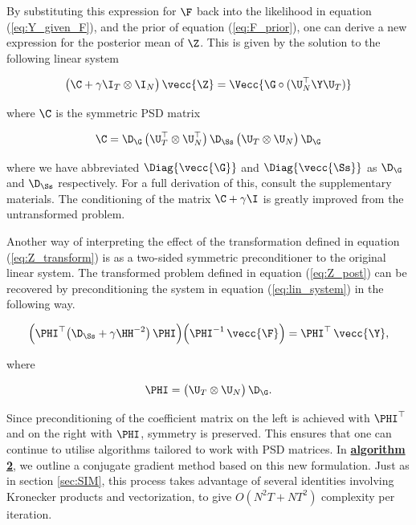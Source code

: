 By substituting this expression for $\F$ back into the likelihood in equation (\ref{eq:Y_given_F}), and the prior of equation (\ref{eq:F_prior}), one can derive a new expression for the posterior mean of $\Z$. This is given by the solution to the following linear system 
    
    \begin{equation}
    \label{eq:Z_post}
       \big( \C + \gamma \I_T \otimes \I_N \big) \, \vecc{\Z} = \Vecc{\G \circ (\U_N^\top \Y \U_T)} 
    \end{equation}
    
    \noindent where $\C$ is the symmetric PSD matrix 
    
    
    \begin{equation}
    \label{eq:Q}
    \C = \D_{\G} \, \big(\U_T^\top \otimes \U_N^\top \big)\, \D_{\Ss} \, \big(\U_T \otimes \U_N \big) \,\D_{\G}
    \end{equation}
    
    \noindent where we have abbreviated $\Diag{\vecc{\G}}$ and $\Diag{\vecc{\Ss}}$ as $\D_{\G}$ and $\D_{\Ss}$ respectively. For a full derivation of this, consult the supplementary materials. The conditioning of the matrix $\C + \gamma \I$ is greatly improved from the untransformed problem. 
    
    Another way of interpreting the effect of the transformation defined in equation (\ref{eq:Z_transform}) is as a two-sided symmetric preconditioner to the original linear system. The transformed problem defined in equation (\ref{eq:Z_post}) can be recovered by preconditioning the system in equation (\ref{eq:lin_system}) in the following way.
    
    \begin{equation}
    \Big(\PHI^\top  \big(\D_{\Ss} + \gamma  \HH^{-2}\big) \, \PHI  \Big) \Big(\PHI^{-1}\, \vecc{ \F } \Big) = \PHI^\top \, \vecc{\Y},
    \end{equation}
    
    \noindent where 
    
    \begin{equation}
    \PHI =   \big(\U_T \otimes \U_N\big) \, \D_{\G}.
    \end{equation}
    
    Since preconditioning of the coefficient matrix on the left is achieved with $\PHI^\top$ and on the right with $\PHI$, symmetry is preserved. This ensures that one can continue to utilise algorithms tailored to work with PSD matrices. In \hyperlink{al2}{\textbf{algorithm 2}}, we outline a conjugate gradient method based on this new formulation. Just as in section \ref{sec:SIM}, this process takes advantage of several identities involving Kronecker products and vectorization, to give $O(N^2T + NT^2)$ complexity per iteration. 
    
